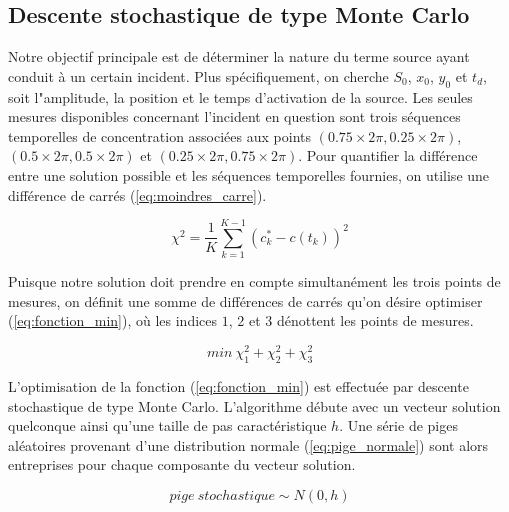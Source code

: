 \documentclass{article}
\begin{document}
\subsection{Descente stochastique de type Monte Carlo}

Notre objectif principale est de déterminer la nature du terme source ayant conduit à un certain incident. Plus spécifiquement, on cherche $S_0$, $x_0$, $y_0$ et $t_d$, soit l"amplitude, la position et le temps d'activation de la source. Les seules mesures disponibles concernant l'incident en question sont trois séquences temporelles de concentration associées aux points $(0.75 \times 2 \pi, 0.25 \times 2 \pi)$, $(0.5 \times 2 \pi, 0.5 \times 2 \pi)$ et $(0.25 \times 2 \pi, 0.75 \times 2 \pi)$. Pour quantifier la différence entre une solution possible et les séquences temporelles fournies, on utilise une différence de carrés (\ref{eq:moindres_carre}).

\begin{equation}\label{eq:moindres_carre}
	\chi^2 = \frac{1}{K} \sum_{k=1}^{K-1}(c_k^* - c(t_k))^2 
\end{equation}

Puisque notre solution doit prendre en compte simultanément les trois points de mesures, on définit une somme de différences de carrés qu'on désire optimiser (\ref{eq:fonction_min}), où les indices $1$, $2$ et $3$ dénottent les points de mesures.

\begin{equation}\label{eq:fonction_min}
	min\ \chi_1^2 + \chi_2^2  + \chi_3^2 
\end{equation}

L'optimisation de la fonction (\ref{eq:fonction_min}) est effectuée par descente stochastique de type Monte Carlo. L'algorithme débute avec un vecteur solution quelconque ainsi qu'une taille de pas caractéristique $h$. Une série de piges aléatoires provenant d'une distribution normale (\ref{eq:pige_normale}) sont alors entreprises pour chaque composante du vecteur solution. 

\begin{equation}\label{eq:pige_normale}
	pige\ stochastique \sim N(0, h)
\end{equation}
\end{document}
